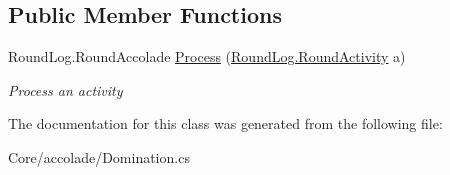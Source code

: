 \subsection*{Public Member Functions}
\begin{DoxyCompactItemize}
\item 
\hypertarget{class_m_b_c_1_1_core_1_1mbc_1_1accolade_1_1_domination_a040a6f1da35856d780a747414a0cd632}{Round\-Log.\-Round\-Accolade \hyperlink{class_m_b_c_1_1_core_1_1mbc_1_1accolade_1_1_domination_a040a6f1da35856d780a747414a0cd632}{Process} (\hyperlink{class_m_b_c_1_1_core_1_1_round_log_1_1_round_activity}{Round\-Log.\-Round\-Activity} a)}\label{class_m_b_c_1_1_core_1_1mbc_1_1accolade_1_1_domination_a040a6f1da35856d780a747414a0cd632}

\begin{DoxyCompactList}\small\item\em Process an activity\end{DoxyCompactList}\end{DoxyCompactItemize}


The documentation for this class was generated from the following file\-:\begin{DoxyCompactItemize}
\item 
Core/accolade/Domination.\-cs\end{DoxyCompactItemize}
